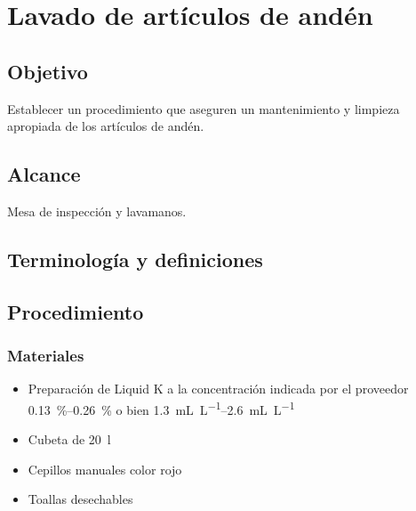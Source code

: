 \thispagestyle{formato-PI}
\renewcommand{\MayorVer}{2}
\renewcommand{\MenorVer}{0}
\renewcommand{\Titulo}{Lavado de artículos de andén}
\renewcommand{\Codigo}{HYS-6-IT}
\renewcommand{\FechaPub}{2023--01}

\section{\Titulo}

\subsection{Objetivo}

Establecer un procedimiento que aseguren un mantenimiento y limpieza apropiada de los artículos de andén.

\subsection{Alcance}

Mesa de inspección y lavamanos.

\subsection{Terminología y definiciones}

\begin{description}
\end{description}

\subsection{Procedimiento}

\subsubsection{Materiales}

\begin{itemize}
	\item Preparación de Liquid K a la concentración indicada por el proveedor \qtyrange{0.13}{0.26}{\percent} o bien \qtyrange{1.3}{2.6}{\milli\liter\per\liter}
	\item Cubeta de \qty{20}{\litre}
	\item Cepillos manuales color rojo
	\item Toallas desechables
\end{itemize}

